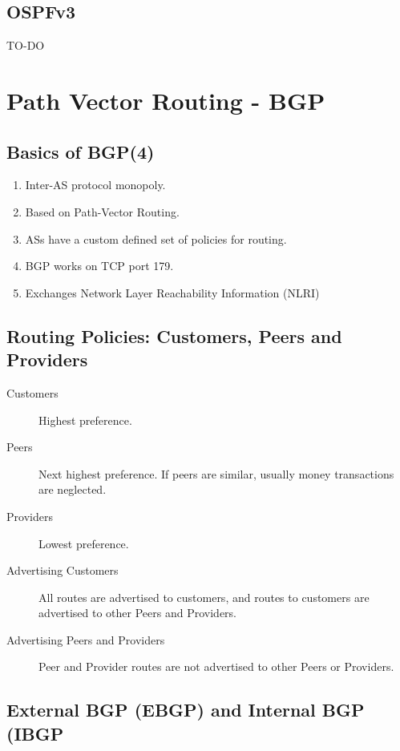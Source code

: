 \documentclass{article}
\begin{document}
\subsection{OSPFv3}

TO-DO


\newpage

\section{Path Vector Routing - BGP}

\subsection{Basics of BGP(4)}


\begin{enumerate}
	\item Inter-AS protocol monopoly.
	\item Based on Path-Vector Routing.
	\item ASs have a custom defined set of policies for routing.
	\item BGP works on TCP port 179.
	\item Exchanges Network Layer Reachability Information (NLRI)
\end{enumerate}


\subsection{Routing Policies: Customers, Peers and Providers}


\begin{description}
	\item[Customers] Highest preference.
	\item[Peers] Next highest preference. If peers are similar, usually money transactions are neglected.
	\item[Providers] Lowest preference. 
\end{description}

\begin{description}
	\item[Advertising Customers] All routes are advertised to customers, and routes to customers are advertised to other Peers and Providers.
	\item[Advertising Peers and Providers] Peer and Provider routes are not advertised to other Peers or Providers.
\end{description}


\subsection{External BGP (EBGP) and Internal BGP (IBGP}
\end{document}
